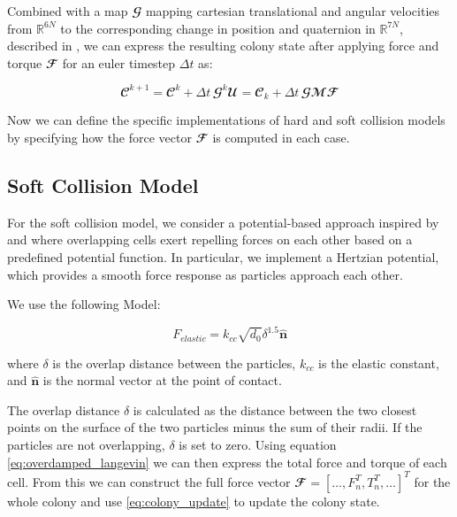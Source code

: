 \documentclass[conference]{IEEEtran}
\begin{document}
Combined with a map $\mathbfcal{G}$ mapping cartesian translational and angular velocities from $\mathbb{R}^{6N}$ to the corresponding change in position and quaternion in $\mathbb{R}^{7N}$, described in \cite{Weady2024}, we can express the resulting colony state after applying force and torque $\mathbfcal{F}$ for an euler timestep $\Delta t$ as:

\begin{equation}
    \mathbfcal{C}^{k+1}  = \mathbfcal{C}^k + \Delta t \, \mathbfcal{G}^k\mathbfcal{U} = \mathbfcal{C}_k + \Delta t \, \mathbfcal{G}\mathbfcal{M} \mathbfcal{F}
\end{equation}
\label{eq:colony_update}



Now we can define the specific implementations of hard and soft collision models by specifying how the force vector $\mathbfcal{F}$ is computed in each case.

\newpage

\subsection{Soft Collision Model}

For the soft collision model, we consider a potential-based approach inspired by \cite{Warren2019} and \cite{You2018} where overlapping cells exert repelling forces on each other based on a predefined potential function. In particular, we implement a Hertzian potential, which provides a smooth force response as particles approach each other.

We use the following Model:

\begin{equation}
    F_{elastic} =k_{cc} \sqrt{d_0} \delta^{1.5} \hat{\mathbf{n}}
\end{equation}

where $\delta$ is the overlap distance between the particles, $k_{cc}$ is the elastic constant, and $\hat{\mathbf{n}}$ is the normal vector at the point of contact.

The overlap distance $\delta$ is calculated as the distance between the two closest points on the surface of the two particles minus the sum of their radii. If the particles are not overlapping, $\delta$ is set to zero. Using equation \autoref{eq:overdamped_langevin} we can then express the total force and torque of each cell. From this we can construct the full force vector $\mathbfcal{F} = [ \dots, F_n^T, T_n^T, \dots]^T$ for the whole colony and use \autoref{eq:colony_update} to update the colony state.
\end{document}

